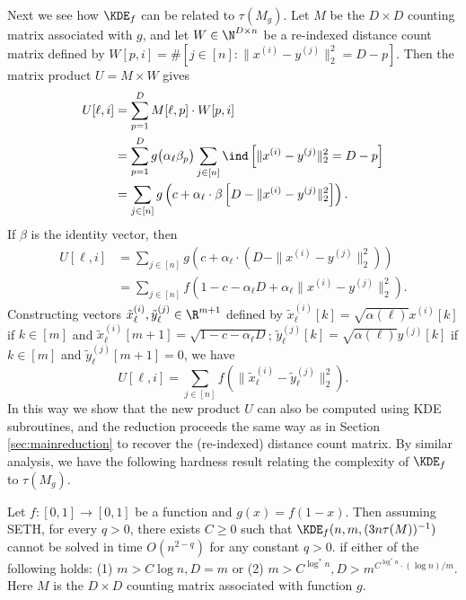 Next we see how $\KDE_f$ can be related to $\tau(M_g)$. Let $M$ be the $D \times D$ counting matrix associated with $g$, and let $W \in \N^{D\times n}$ be a re-indexed distance count matrix defined by $W[p, i] = \#[j\in [n]: \|x^{(i)}-y^{(j)}\|_2^2 = D-p]$. Then the matrix product $U = M \times W$ gives 
\begin{align}
U[\ell, i] &= \sum_{p=1}^D M[\ell, p] \cdot W[p, i] \notag\\ 
&=\sum_{p=1}^D g\big(\alpha_\ell\beta_p\big) 
\sum_{j \in [n]} \ind\left[\|x^{(i)} - y^{(j)}\|_2^2 = D-p\right] \notag\\
&=\sum_{j \in [n]} g\left(c + \alpha_\ell \cdot \beta\left[D-\|x^{(i)} - y^{(j)}\|_2^2\right]\right).
\end{align}
If $\beta$ is the identity vector, then
\begin{align*}
U[\ell, i] &=\sum_{j \in [n]} g\left(c + \alpha_\ell \cdot (D-\|x^{(i)} - y^{(j)}\|_2^2)\right) \\
&=\sum_{j \in [n]} f\left(1 - c - \alpha_\ell D + \alpha_\ell \|x^{(i)} - y^{(j)}\|_2^2 \right).
\end{align*}
Constructing vectors $\tilde x_{\ell}^{(i)}, \tilde y_{\ell}^{(j)} \in \R^{m+1}$ defined by $\tilde x_{\ell}^{(i)}[k] = \sqrt{\alpha(\ell)} x^{(i)}[k]$ if $k \in [m]$ and $\tilde x_{\ell}^{(i)}[m+1] = \sqrt {1-c-\alpha_{\ell}D}$;
$\tilde y_{\ell}^{(j)}[k] = \sqrt{\alpha(\ell)} y^{(j)}[k]$ if $k \in [m]$ and $\tilde y_{\ell}^{(j)}[m+1] = 0$,
we have
\[U[\ell, i] = \sum_{j \in [n]}f(\|\tilde x_{\ell}^{(i)} - \tilde y_\ell^{(j)}\|_2^2).\]
In this way we show that the new product $U$ can also be computed using KDE subroutines, and the reduction proceeds the same way as in Section \ref{sec:mainreduction} to recover the (re-indexed) distance count matrix.
By similar analysis, we have the following hardness result relating the complexity of $\KDE_f$ to $\tau(M_g)$.
\begin{theorem} \label{thm:pdkdehardness}
Let $f: [0, 1]\rightarrow [0, 1]$ be a function and $g(x) = f(1-x)$.
Then assuming SETH, for every $q > 0$, there exists $C \ge 0$ such that $\KDE_f(n, m, (3n\tau(M))^{-1})$
cannot be solved in time $O(n^{2-q})$ for any constant $q>0$. if either of the following holds: (1) $m > C \log n, D = m$ or (2) $m > C^{\log^* n}, D > m^{C^{\log^* n} \cdot (\log n)/m}$. Here $M$ is the $D \times D$ counting matrix associated with function $g$.
\end{theorem}


